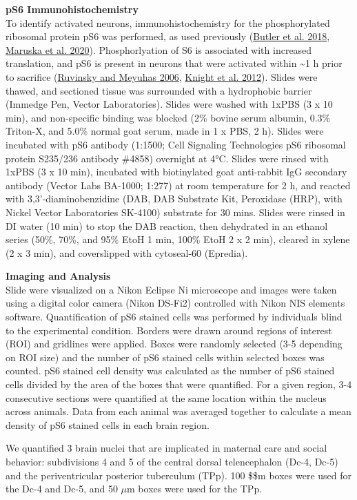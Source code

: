 \documentclass[
  12pt,
]{article}
\begin{document}
\textbf{pS6 Immunohistochemistry}\\
To identify activated neurons, immunohistochemistry for the phosphorylated ribosomal protein pS6 was performed, as used previously (\protect\hyperlink{ref-RN24}{Butler et al. 2018}, \protect\hyperlink{ref-RN18}{Maruska et al. 2020}). Phosphorlyation of S6 is associated with increased translation, and pS6 is present in neurons that were activated within \textasciitilde1 h prior to sacrifice (\protect\hyperlink{ref-RN27}{Ruvinsky and Meyuhas 2006}, \protect\hyperlink{ref-RN25}{Knight et al. 2012}). Slides were thawed, and sectioned tissue was surrounded with a hydrophobic barrier (Immedge Pen, Vector Laboratories). Slides were washed with 1xPBS (3 x 10 min), and non-specific binding was blocked (2\% bovine serum albumin, 0.3\% Triton-X, and 5.0\% normal goat serum, made in 1 x PBS, 2 h). Slides were incubated with pS6 antibody (1:1500; Cell Signaling Technologies pS6 ribosomal protein S235/236 antibody \#4858) overnight at 4°C. Slides were rinsed with 1xPBS (3 x 10 min), incubated with biotinylated goat anti-rabbit IgG secondary antibody (Vector Labs BA-1000; 1:277) at room temperature for 2 h, and reacted with 3,3'-diaminobenzidine (DAB, DAB Substrate Kit, Peroxidase (HRP), with Nickel Vector Laboratories SK-4100) substrate for 30 mins. Slides were rinsed in DI water (10 min) to stop the DAB reaction, then dehydrated in an ethanol series (50\%, 70\%, and 95\% EtoH 1 min, 100\% EtoH 2 x 2 min), cleared in xylene (2 x 3 min), and coverslipped with cytoseal-60 (Epredia).

\textbf{Imaging and Analysis}\\
Slide were visualized on a Nikon Eclipse Ni microscope and images were taken using a digital color camera (Nikon DS-Fi2) controlled with Nikon NIS elements software. Quantification of pS6 stained cells was performed by individuals blind to the experimental condition. Borders were drawn around regions of interest (ROI) and gridlines were applied. Boxes were randomly selected (3-5 depending on ROI size) and the number of pS6 stained cells within selected boxes was counted. pS6 stained cell density was calculated as the number of pS6 stained cells divided by the area of the boxes that were quantified. For a given region, 3-4 consecutive sections were quantified at the same location within the nucleus across animals. Data from each animal was averaged together to calculate a mean density of pS6 stained cells in each brain region.

We quantified 3 brain nuclei that are implicated in maternal care and social behavior: subdivisions 4 and 5 of the central dorsal telencephalon (Dc-4, Dc-5) and the periventricular posterior tuberculum (TPp). 100 \$\mu \$m boxes were used for the Dc-4 and Dc-5, and 50 \(\mu\)m boxes were used for the TPp.
\end{document}
